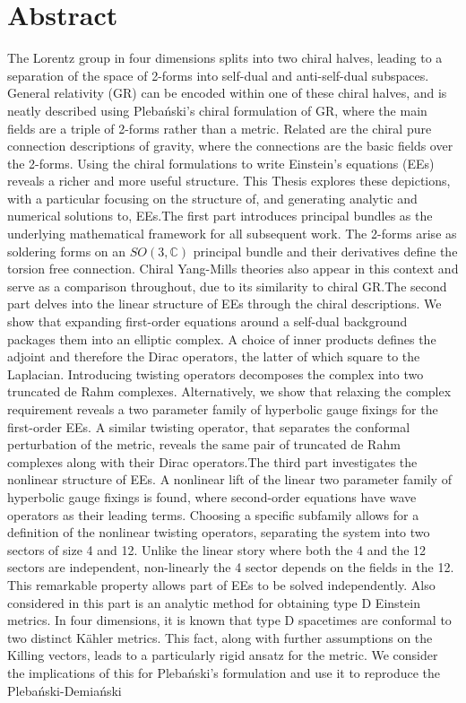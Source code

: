 \documentclass[10pt]{report}
\newcommand{\pleb}[0]{Pleba\'nski}
\newcommand{\demi}[0]{Demia\'nski}
\theoremstyle{definition}
\newcommand{\C}[0]{\mathbb{C}}
\begin{document}
    \chapter*{Abstract}
    \setlength\parindent{24pt}
The Lorentz group in four dimensions splits into two chiral halves, leading to a separation of the space of 2-forms into self-dual and anti-self-dual subspaces. General relativity (GR) can be encoded within one of these chiral halves, and is neatly described using \pleb{}'s chiral formulation of GR, where the main fields are a triple of 2-forms rather than a metric. Related are the chiral pure connection descriptions of gravity, where the connections are the basic fields over the 2-forms. Using the chiral formulations to write Einstein's equations (EEs) reveals a richer and more useful structure. This Thesis explores these depictions, with a particular focusing on the structure of, and generating analytic and numerical solutions to, EEs.\newline\indent The first part introduces principal bundles as the underlying mathematical framework for all subsequent work. The 2-forms arise as soldering forms on an $SO(3,\C)$ principal bundle and their derivatives define the torsion free connection. Chiral Yang-Mills theories also appear in this context and serve as a comparison throughout, due to its similarity to chiral GR.\newline\indent The second part delves into the linear structure of EEs through the chiral descriptions. We show that expanding first-order equations around a self-dual background packages them into an elliptic complex. A choice of inner products defines the adjoint and therefore the Dirac operators, the latter of which square to the Laplacian. Introducing twisting operators decomposes the complex into two truncated de Rahm complexes. Alternatively, we show that relaxing the complex requirement reveals a two parameter family of hyperbolic gauge fixings for the first-order EEs. A similar twisting operator, that separates the conformal perturbation of the metric, reveals the same pair of truncated de Rahm complexes along with their Dirac operators.\newline\indent The third part investigates the nonlinear structure of EEs. A nonlinear lift of the linear two parameter family of hyperbolic gauge fixings is found, where second-order equations have wave operators as their leading terms. Choosing a specific subfamily allows for a definition of the nonlinear twisting operators, separating the system into two sectors of size 4 and 12. Unlike the linear story where both the 4 and the 12 sectors are independent, non-linearly the 4 sector depends on the fields in the 12. This remarkable property allows part of EEs to be solved independently. Also considered in this part is an analytic method for obtaining type D Einstein metrics. In four dimensions, it is known that type D spacetimes are conformal to two distinct K\"ahler metrics. This fact, along with further assumptions on the Killing vectors, leads to a particularly rigid ansatz for the metric. We consider the implications of this for \pleb{}'s formulation and use it to reproduce the \pleb{}-\demi{} 
\end{document}
